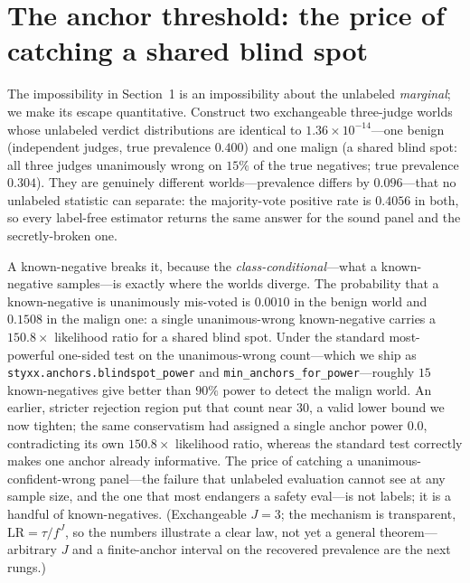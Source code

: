\documentclass[11pt]{article}
\begin{document}
\section{The anchor threshold: the price of catching a shared blind spot}

The impossibility in Section~1 is an impossibility about the unlabeled \emph{marginal}; we make its
escape quantitative. Construct two exchangeable three-judge worlds whose unlabeled verdict
distributions are identical to $1.36\times10^{-14}$---one benign (independent judges, true prevalence
$0.400$) and one malign (a shared blind spot: all three judges unanimously wrong on $15\%$ of the true
negatives; true prevalence $0.304$). They are genuinely different worlds---prevalence differs by
$0.096$---that no unlabeled statistic can separate: the majority-vote positive rate is $0.4056$ in both,
so every label-free estimator returns the same answer for the sound panel and the secretly-broken one.

A known-negative breaks it, because the \emph{class-conditional}---what a known-negative samples---is
exactly where the worlds diverge. The probability that a known-negative is unanimously mis-voted is
$0.0010$ in the benign world and $0.1508$ in the malign one: a single unanimous-wrong known-negative
carries a $150.8\times$ likelihood ratio for a shared blind spot. Under the standard most-powerful
one-sided test on the unanimous-wrong count---which we ship as \texttt{styxx.anchors.blindspot\_power}
and \texttt{min\_anchors\_for\_power}---roughly $15$ known-negatives give better than $90\%$ power to
detect the malign world. An earlier, stricter rejection region put that count near $30$, a valid lower
bound we now tighten; the same conservatism had assigned a single anchor power $0.0$, contradicting its
own $150.8\times$ likelihood ratio, whereas the standard test correctly makes one anchor already
informative. The price of catching a unanimous-confident-wrong panel---the failure that unlabeled
evaluation cannot see at any sample size, and the one that most endangers a safety eval---is not labels;
it is a handful of known-negatives. (Exchangeable $J{=}3$; the mechanism is transparent,
$\text{LR} = \tau / f^{J}$, so the numbers illustrate a clear law, not yet a general theorem---arbitrary
$J$ and a finite-anchor interval on the recovered prevalence are the next rungs.)
\end{document}
